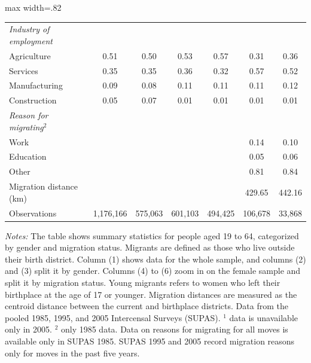 \begin{center}
\begin{adjustbox}{max width=.82\textwidth}
\begin{threeparttable}[!h]
\begin{tabular}{lcccccc}
\textit{Industry of employment} \\
\hspace{3mm}Agriculture &      0.51 &      0.50 &      0.53 &      0.57 &      0.31 &      0.36\\
\hspace{3mm}Services &      0.35 &      0.35 &      0.36 &      0.32 &      0.57 &      0.52\\
\hspace{3mm}Manufacturing &      0.09 &      0.08 &      0.11 &      0.11 &      0.11 &      0.12\\
\hspace{3mm}Construction &      0.05 &      0.07 &      0.01 &      0.01 &      0.01 &      0.01\\
\textit{Reason for migrating$^2$} \\
\hspace{3mm}Work &  &  &  &  &      0.14 &      0.10\\
\hspace{3mm}Education &  &  &  &  &      0.05 &      0.06\\
\hspace{3mm}Other &  &  &  &  &      0.81 &      0.84\\
Migration distance (km) &  &  &  &  &    429.65 &    442.16\\
\midrule Observations & 1,176,166 &   575,063 &   601,103 &   494,425 &   106,678 &    33,868\\
\bottomrule
\bottomrule
\end{tabular}
\begin{tablenotes}
\item \footnotesize \textit{Notes:} The table shows summary statistics for people aged 19 to 64, categorized by gender and migration status. Migrants are defined as those who live outside their birth district. Column (1) shows data for the whole sample, and columns (2) and (3) split it by gender. Columns (4) to (6) zoom in on the female sample and split it by migration status. Young migrants refers to women who left their birthplace at the age of 17 or younger. Migration distances are measured as the centroid distance between the current and birthplace districts. Data from the pooled 1985, 1995, and 2005 Intercensal Surveys (SUPAS). $^1 $ data is unavailable only in 2005. $^2 $ only 1985 data. Data on reasons for migrating for all moves is available only in SUPAS 1985. SUPAS 1995 and 2005 record migration reasons only for moves in the past five years. 
\end{tablenotes}
\end{threeparttable}
\end{adjustbox}
\end{center}
